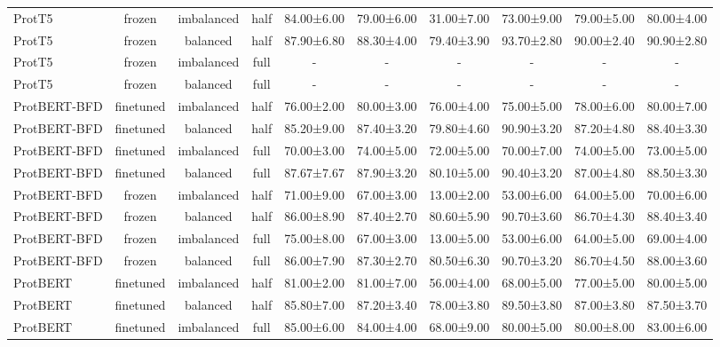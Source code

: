 \begin{tabular}{lccccccccc}
      ProtT5 &         frozen & imbalanced &      half &  84.00±6.00 & 79.00±6.00 & 31.00±7.00 & 73.00±9.00 &  79.00±5.00 &  80.00±4.00 \\
      ProtT5 &         frozen &   balanced &      half &  87.90±6.80 & 88.30±4.00 & 79.40±3.90 & 93.70±2.80 &  90.00±2.40 &  90.90±2.80 \\
      ProtT5 &         frozen & imbalanced &      full &           - &          - &          - &          - &           - &           - \\
      ProtT5 &         frozen &   balanced &      full &           - &          - &          - &          - &           - &           - \\
ProtBERT-BFD &      finetuned & imbalanced &      half &  76.00±2.00 & 80.00±3.00 & 76.00±4.00 & 75.00±5.00 &  78.00±6.00 &  80.00±7.00 \\
ProtBERT-BFD &      finetuned &   balanced &      half &  85.20±9.00 & 87.40±3.20 & 79.80±4.60 & 90.90±3.20 &  87.20±4.80 &  88.40±3.30 \\
ProtBERT-BFD &      finetuned & imbalanced &      full &  70.00±3.00 & 74.00±5.00 & 72.00±5.00 & 70.00±7.00 &  74.00±5.00 &  73.00±5.00 \\
ProtBERT-BFD &      finetuned &   balanced &      full &  87.67±7.67 & 87.90±3.20 & 80.10±5.00 & 90.40±3.20 &  87.00±4.80 &  88.50±3.30 \\
ProtBERT-BFD &         frozen & imbalanced &      half &  71.00±9.00 & 67.00±3.00 & 13.00±2.00 & 53.00±6.00 &  64.00±5.00 &  70.00±6.00 \\
ProtBERT-BFD &         frozen &   balanced &      half &  86.00±8.90 & 87.40±2.70 & 80.60±5.90 & 90.70±3.60 &  86.70±4.30 &  88.40±3.40 \\
ProtBERT-BFD &         frozen & imbalanced &      full &  75.00±8.00 & 67.00±3.00 & 13.00±5.00 & 53.00±6.00 &  64.00±5.00 &  69.00±4.00 \\
ProtBERT-BFD &         frozen &   balanced &      full &  86.00±7.90 & 87.30±2.70 & 80.50±6.30 & 90.70±3.20 &  86.70±4.50 &  88.00±3.60 \\
    ProtBERT &      finetuned & imbalanced &      half &  81.00±2.00 & 81.00±7.00 & 56.00±4.00 & 68.00±5.00 &  77.00±5.00 &  80.00±5.00 \\
    ProtBERT &      finetuned &   balanced &      half &  85.80±7.00 & 87.20±3.40 & 78.00±3.80 & 89.50±3.80 &  87.00±3.80 &  87.50±3.70 \\
    ProtBERT &      finetuned & imbalanced &      full &  85.00±6.00 & 84.00±4.00 & 68.00±9.00 & 80.00±5.00 &  80.00±8.00 &  83.00±6.00 \\

\end{tabular}
